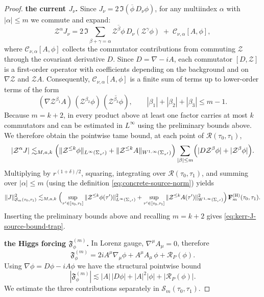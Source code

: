 \documentclass[11pt]{article}
\numberwithin{equation}{section}
\theoremstyle{plain}
\theoremstyle{definition}
\theoremstyle{remark}
\begin{document}
\begin{proof}
\smallskip\noindent
\textbf{the current $J_\nu$.}
Since $J_\nu=2\,\Im(\overline\phi\,D_\nu\phi)$, for any multiindex $\alpha$ with $|\alpha|\le m$ we commute and expand:
\begin{equation}
\mathcal Z^\alpha J_\nu
=
2\,\Im\!\!\sum_{\beta+\gamma=\alpha}
\overline{\mathcal Z^\beta\phi}\,D_\nu(\mathcal Z^\gamma\phi)
\;+\;
\mathcal C_{\nu,\alpha}[A,\phi],
\end{equation}
where $\mathcal C_{\nu,\alpha}[A,\phi]$ collects the commutator contributions from commuting $\mathcal Z$ through the covariant derivative $D$.
Since $D=\nabla-iA$, each commutator $[D,\mathcal Z]$ is a first-order operator with coefficients depending on the background and on $\nabla\mathcal Z$ and $\mathcal Z A$.
Consequently, $\mathcal C_{\nu,\alpha}[A,\phi]$ is a finite sum of terms up to lower-order terms of the form
\begin{equation}
(\nabla\mathcal Z^{\beta_1}A)\,(\mathcal Z^{\beta_2}\phi)\,(\overline{\mathcal Z^{\beta_3}\phi}),
\qquad |\beta_1|+|\beta_2|+|\beta_3|\le m-1.
\end{equation}
Because $m=k+2$, in every product above at least one factor carries at most $k$ commutators and can be estimated in $L^\infty$ using the preliminary bounds above.
We therefore obtain the pointwise tame bound, at each point of $\mathcal R(\tau_{0},\tau_{1})$,
\begin{equation}
|\mathcal Z^\alpha J|
\lesssim_{M,a,k}
\Bigl(\|\mathcal Z^{\le k}\phi\|_{L^\infty(\Sigma_{\tau'})}
+\|\mathcal Z^{\le k}A\|_{W^{1,\infty}(\Sigma_{\tau'})}\Bigr)
\sum_{|\beta|\le m}\Bigl(|D\mathcal Z^\beta\phi|+|\mathcal Z^\beta\phi|\Bigr).
\end{equation}
Multiplying by $r^{(1+\delta)/2}$, squaring, integrating over $\mathcal R(\tau_{0},\tau_{1})$, and summing over $|\alpha|\le m$ (using the definition \eqref{eq:concrete-source-norm}) yields
\begin{equation}
\|J\|_{\mathcal S_{m}(\tau_0,\tau_1)}^{2}
\lesssim_{M,a,k}
\Bigl(
\sup_{\tau'\in[\tau_0,\tau_1]}\|\mathcal Z^{\le k}\phi(\tau')\|_{L^\infty(\Sigma_{\tau'})}^{2}
+
\sup_{\tau'\in[\tau_0,\tau_1]}\|\mathcal Z^{\le k}A(\tau')\|_{W^{1,\infty}(\Sigma_{\tau'})}^{2}
\Bigr)\,
\mathbf F_{m}^{(\mathrm H)}(\tau_0,\tau_1).
\end{equation}
Inserting the preliminary bounds above and recalling $m=k+2$ gives \eqref{eq:kerr-J-source-bound-trap}.

\smallskip\noindent
\textbf{the Higgs forcing $\mathfrak F_\phi^{(m)}$.}
In Lorenz gauge, $\nabla^\mu A_\mu=0$, therefore
\begin{equation}
\mathfrak F_\phi^{(m)}
=
2iA^\mu\nabla_\mu\phi
+A^\mu A_\mu\,\phi
+\mathcal R_P(\phi).
\end{equation}
Using $\nabla\phi=D\phi-iA\phi$ we have the structural pointwise bound
\begin{equation}
|\mathfrak F_\phi^{(m)}|
\lesssim
|A|\,|D\phi|+|A|^{2}|\phi|+|\mathcal R_P(\phi)|.
\end{equation}
We estimate the three contributions separately in $\mathcal S_m(\tau_{0},\tau_{1})$.


\end{proof}
\end{document}
